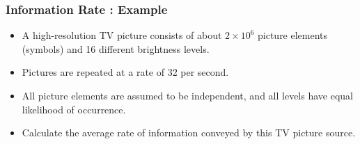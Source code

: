 \documentclass[a4]{beamer}
\begin{document}
\begin{frame}
\frametitle{Information Rate : Example}
\begin{itemize}

\item A high-resolution TV picture consists of about $2 \times 10^6$ picture elements (symbols) and 16
different brightness levels. \item Pictures are repeated at a rate of 32 per second. \item All picture elements
are assumed to be independent, and all levels have equal likelihood of occurrence. \item Calculate the
average rate of information conveyed by this TV picture source.

\end{itemize}
\end{frame}
\end{document}
